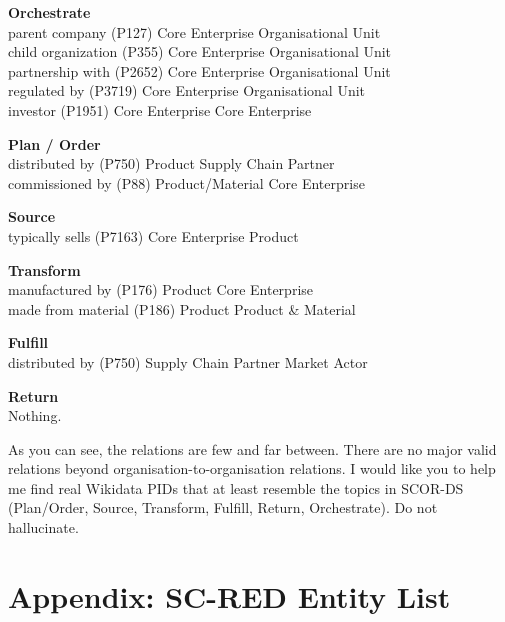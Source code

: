 \begin{appendices}
\bigskip

\begin{tcolorbox}[promptbox, title=Relation PID Extraction Prompt]
\textbf{Orchestrate}\\
parent company (P127) \textemdash{} Core Enterprise \textemdash{} Organisational Unit\\
child organization (P355) \textemdash{} Core Enterprise \textemdash{} Organisational Unit\\
partnership with (P2652) \textemdash{} Core Enterprise \textemdash{} Organisational Unit\\
regulated by (P3719) \textemdash{} Core Enterprise \textemdash{} Organisational Unit\\
investor (P1951) \textemdash{} Core Enterprise \textemdash{} Core Enterprise

\medskip
\textbf{Plan / Order}\\
distributed by (P750) \textemdash{} Product \textemdash{} Supply Chain Partner\\
commissioned by (P88) \textemdash{} Product/Material \textemdash{} Core Enterprise

\medskip
\textbf{Source}\\
typically sells (P7163) \textemdash{} Core Enterprise \textemdash{} Product

\medskip
\textbf{Transform}\\
manufactured by (P176) \textemdash{} Product \textemdash{} Core Enterprise\\
made from material (P186) \textemdash{} Product \textemdash{} Product \& Material

\medskip
\textbf{Fulfill}\\
distributed by (P750) \textemdash{} Supply Chain Partner \textemdash{} Market Actor

\medskip
\textbf{Return}\\
Nothing.

\medskip
As you can see, the relations are few and far between. There are no
major valid relations beyond organisation-to-organisation relations.
I would like you to help me find real Wikidata PIDs that at least
resemble the topics in SCOR-DS (Plan/Order, Source, Transform,
Fulfill, Return, Orchestrate). Do not hallucinate.
\end{tcolorbox}

\chapter{Appendix: SC-RED Entity List}
\label{app:entity_list}


\end{appendices}
